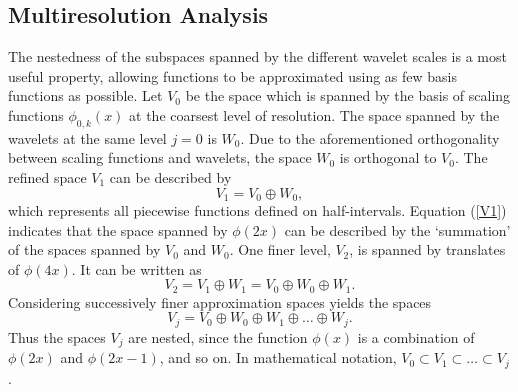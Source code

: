 \documentclass[11pt]{article}
\begin{document}
\subsection{Multiresolution Analysis}
The nestedness of the subspaces spanned by the different wavelet scales is a most useful property, allowing functions
to be approximated using as few basis functions as possible. Let $V_0$ be the space which is spanned by the basis of 
scaling functions $\phi_{0,k}(x)$ at the coarsest level of resolution. The space spanned by the wavelets at the same
level $j=0$ is $W_0$. Due to the aforementioned orthogonality between scaling functions and wavelets, the space
$W_0$ is orthogonal to $V_0$. The refined space $V_1$ can be described by
\begin{equation}
V_1 = V_0 \oplus W_0,
\label{V1}
\end{equation}
which represents all piecewise functions defined on half-intervals. Equation (\ref{V1}) indicates that the space spanned by 
$\phi(2x)$ can be described by the `summation' of the spaces spanned by
$V_0$ and $W_0$. One finer level, $V_2$, is spanned by translates of $\phi(4x)$. It can be written as
\begin{equation}
V_2 = V_1 \oplus W_1 = V_0 \oplus W_0 \oplus W_1.
\label{V2}
\end{equation}
Considering successively finer approximation spaces yields the spaces
\begin{equation}
V_j = V_0 \oplus W_0 \oplus W_1 \oplus \dots \oplus W_j.
\end{equation}
Thus the spaces $V_j$ are nested, since the function $\phi(x)$ is a combination of $\phi(2x)$ and $\phi(2x-1)$, and so on. 
In mathematical notation, $V_0 \subset V_1 \subset \dots \subset V_j$.

\end{document}
